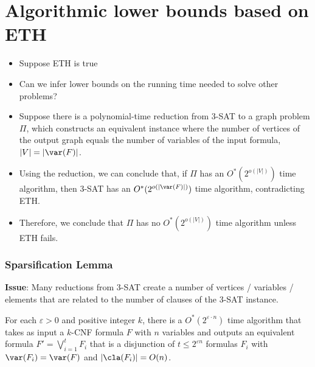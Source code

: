\section{Algorithmic lower bounds based on ETH}

\begin{frame}
 
 \begin{itemize}
  \item Suppose ETH is true
  \item Can we infer lower bounds on the running time needed to solve other problems?
 \pause
  \item Suppose there is a polynomial-time reduction from 3-SAT to a graph problem $\Pi$, which constructs an equivalent instance where the number of vertices of the output graph equals the number of variables of the input formula, $|V|=|\var(F)|$.
  \item Using the reduction, we can conclude that, if $\Pi$ has an $O^*(2^{o(|V|)})$ time algorithm, then 3-SAT has an $O^*(2^{o(|\var(F)|)})$ time algorithm, contradicting ETH.\\
  \item Therefore, we conclude that $\Pi$ has no $O^*(2^{o(|V|)})$ time algorithm unless ETH fails.
 \end{itemize}
\end{frame}

\begin{frame}
 \frametitle{Sparsification Lemma}
 
 \noindent
 \textbf{Issue}: Many reductions from 3-SAT create a number of vertices / variables / elements that are related to the number of \alert{clauses} of the 3-SAT instance.
 
 \pause
 \begin{theorem}
  For each $\varepsilon > 0$ and positive integer $k$, there is a $O^*(2^{\varepsilon \cdot n})$ time algorithm that takes as input a $k$-CNF formula $F$ with $n$ variables and outputs an equivalent formula $F'=\bigvee_{i=1}^t F_i$ that is a disjunction of $t\le 2^{\varepsilon n}$ formulas $F_i$ with $\var(F_i)=\var(F)$ and $|\cla(F_i)| = O(n)$.
 \end{theorem}

\end{frame}

